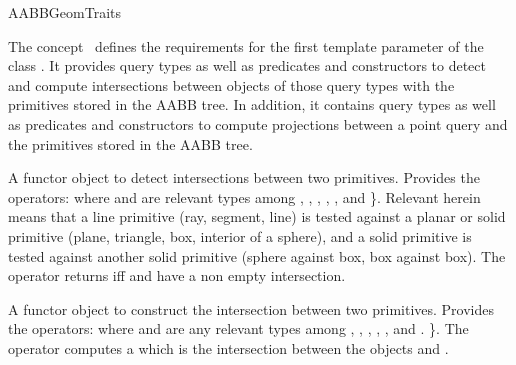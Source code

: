 \ccRefPageBegin


\begin{ccRefConcept}{AABBGeomTraits}


\ccDefinition
  
The concept \ccRefName\ defines the requirements for the first template parameter of the class . It provides query types as well as predicates and constructors to detect and compute intersections between objects of those query types with the primitives stored in the AABB tree. In addition, it contains query types as well as predicates and constructors to compute projections between a point query and the primitives stored in the AABB tree.


\ccTypes


{A functor object to detect intersections between two primitives.
Provides the operators:
where  and  are relevant types
among , , , , ,  and  \}. Relevant herein means that a line primitive (ray, segment, line) is tested against a planar or solid primitive (plane, triangle, box, interior of a sphere), and a solid primitive is tested against another solid primitive (sphere against box, box against box). The operator returns  iff  and  have a non empty intersection.}

{A functor object to construct the intersection between two primitives.
Provides the operators:
 where  and  are any relevant types among , , ,  , ,  and . \}. The operator computes a  which is the intersection between the objects  and .}


\end{ccRefConcept}
